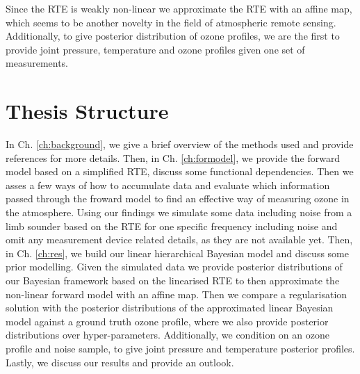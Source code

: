 Since the RTE is weakly non-linear we approximate the RTE with an affine map, which seems to be another novelty in the field of atmospheric remote sensing.
Additionally, to give posterior distribution of ozone profiles, we are the first to provide joint pressure, temperature and ozone profiles given one set of measurements. \cite{}


\section{Thesis Structure}
In Ch. \ref{ch:background}, we give a brief overview of the methods used and provide references for more details.
Then, in Ch. \ref{ch:formodel}, we provide the forward model based on a simplified RTE, discuss some functional dependencies.
Then we asses a few ways of how to accumulate data and evaluate which information passed through the froward model to find an effective way of measuring ozone in the atmosphere.
Using our findings we simulate some data including noise from a limb sounder based on the RTE for one specific frequency including noise and omit any measurement device related details, as they are not available yet.
Then, in Ch. \ref{ch:res}, we build our linear hierarchical Bayesian model and discuss some prior modelling.
Given the simulated data we provide posterior distributions of our Bayesian framework based on the linearised RTE to then approximate the non-linear forward model with an affine map. 
Then we compare a regularisation solution with the posterior distributions of the approximated linear Bayesian model against a ground truth ozone profile, where we also provide posterior distributions over hyper-parameters.
Additionally, we condition on an ozone profile and noise sample, to give joint pressure and temperature posterior profiles.
Lastly, we discuss our results and provide an outlook.
